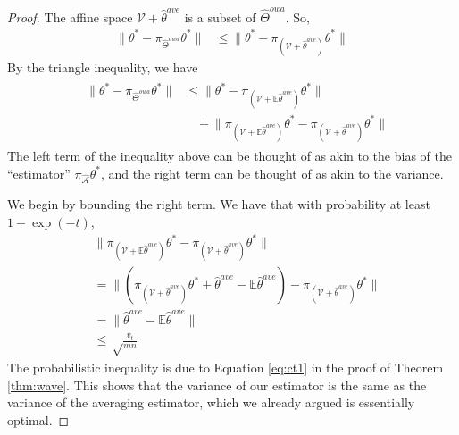 \documentclass[twoside]{article}
\DeclareMathOperator*{\affspan}{aff}
\newcommand{\W}{{\hat \Theta^{\textit{owa}}}}
\newcommand{\Waff}{\mathcal{\hat A}}
\newcommand{\WaffE}{{\mathcal{\hat A}_\E}}
\newcommand{\Wave}{{\mathcal{\hat W}^{ave}}}
\newcommand{\Wtave}{{\mathcal{W}^{ave,*}}}
\newcommand{\V}{\mathcal{V}}
\newcommand{\E}{\mathbb{E}}
\newcommand{\w}{\theta}
\newcommand{\wave}{\hat\w^{ave}}
\newcommand{\wtave}{\E\hat\w^{ave}}
\newcommand{\wmle}{\hat\w^{mle}}
\newcommand{\wstar}{{\w^{*}}}
\newcommand{\ltwo}[1]{{\lVert {#1} \rVert}}
\newcommand{\proj}[1]{\pi_{{#1}}}
\begin{document}
\begin{proof}
{The affine space $\V+\wave$ is a subset of $\W$.
So,
\begin{align}
\ltwo{\wstar-\proj\W\wstar}
&\le
\ltwo{\wstar-\proj{(\V+\wave)}\wstar}
\end{align}
By the triangle inequality, we have
\begin{align}
&\begin{aligned}
\ltwo{\wstar-\proj\W\wstar}
&\le
\ltwo{\wstar-\proj{(\V+\E\wave)}\wstar}
\\&~~~~
+
\ltwo{\proj{(\V+\E\wave)}\wstar-\proj{(\V+\wave)}\wstar}
\end{aligned}
\end{align}
The left term of the inequality above can be thought of as akin to the bias of the ``estimator'' $\proj\Waff\wstar$,
and the right term can be thought of as akin to the variance.

We begin by bounding the right term.
We have that with probability at least $1-\exp(-t)$,
\begin{align}
&\ltwo{\proj{(\V+\wtave)}\wstar-\proj{(\V+\wave)}\wstar}
\\
&=
\ltwo{(\proj{(\V+\wave)}\wstar + \wave - \wtave) -\proj{(\V+\wave)}\wstar}
\\&=
\ltwo{\wave-\wtave}
\\&\le
\sqrt\frac{v_t}{mn}
\end{align}
The probabilistic inequality is due to Equation \ref{eq:ct1} in the proof of Theorem \ref{thm:wave}.
This shows that the variance of our estimator is the same as the variance of the averaging estimator,
which we already argued is essentially optimal.


}
\end{proof}
\end{document}
